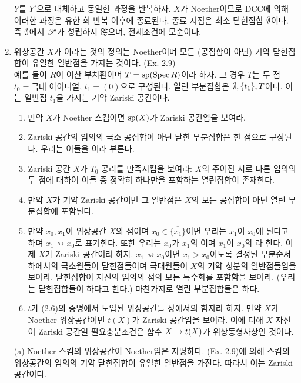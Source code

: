 \begin{enumerate}[label=\tb{3.\arabic*.},itemindent=0mm,itemsep=4mm]
	$Y$를 $Y'$으로 대체하고 동일한 과정을 반복하자. $X$가 Noether이므로 DCC에 의해 이러한 과정은 유한 회 반복 이후에 종료된다.
	종료 지점은 최소 닫힌집합 $\es$이다. 즉 $\es$에서 $\ms P$가 성립하지 않으며, 전제조건에 모순이다.
	\item {} 위상공간 $X$가 이라는 것의 정의는 Noether이며
	모든 (공집합이 아닌) 기약 닫힌집합이 유일한 일반점을 가지는 것이다. (Ex. 2.9)\\
	예를 들어 $R$이 이산 부치환이며 $T=\sp(\Spec R)$이라 하자. 그 경우 $T$는 두 점 $t_0=$극대 아이디얼, $t_1=(0)$으로 구성된다.
	열린 부분집합은 $\es,\{t_1\},T$이다. 이는 일반점 $t_1$을 가지는 기약 Zariski 공간이다.
	\begin{enumerate}[label=(\alph*)]
	\item 만약 $X$가 Noether 스킴이면 $\sp(X)$가 Zariski 공간임을 보여라.
	\item Zariski 공간의 임의의 극소 공집합이 아닌 닫힌 부분집합은 한 점으로 구성된다.
	우리는 이들을 이라 부른다.
	\item Zariski 공간 $X$가 $T_0$ 공리를 만족시킴을 보여라:
	$X$의 주어진 서로 다른 임의의 두 점에 대하여 이들 중 정확히 하나만을 포함하는 열린집합이 존재한다.
	\item 만약 $X$가 기약 Zariski 공간이면 그 일반점은 $X$의 모든 공집합이 아닌 열린 부분집합에 포함된다.
	\item 만약 $x_0,x_1$이 위상공간 $X$의 점이며 $x_0\in\overline{\{x_1\}}$이면
	우리는 $x_1$이 $x_0$에 된다고 하며 $x_1\rightsquigarrow x_0$로 표기한다.
	또한 우리는 $x_0$가 $x_1$의 이며 $x_1$이 $x_0$의 라 한다.
	이제 $X$가 Zariski 공간이라 하자. $x_1\rightsquigarrow x_0$이면 $x_1>x_0$이도록 결정된 부분순서 하에서의 극소원들이 닫힌점들이며
	극대원들이 $X$의 기약 성분의 일반점들임을 보여라. 닫힌집합이 자신의 임의의 점의 모든 특수화를 포함함을 보여라.
	(우리는 닫힌집합들이 하다고 한다.)
	마찬가지로 열린 부분집합들은 하다.
	\item $t$가 (2.6)의 증명에서 도입된 위상공간들 상에서의 함자라 하자.
	만약 $X$가 Noether 위상공간이면 $t(X)$가 Zariski 공간임을 보여라.
	이에 더해 $X$ 자신이 Zariski 공간일 필요충분조건은 함수 $X\ra t(X)$가 위상동형사상인 것이다.
	\end{enumerate}
	\sol (a) Noether 스킴의 위상공간이 Noether임은 자명하다.
	(Ex. 2.9)에 의해 스킴의 위상공간의 임의의 기약 닫힌집합이 유일한 일반점을 가진다. 따라서 이는 Zariski 공간이다.\\

\end{enumerate}
